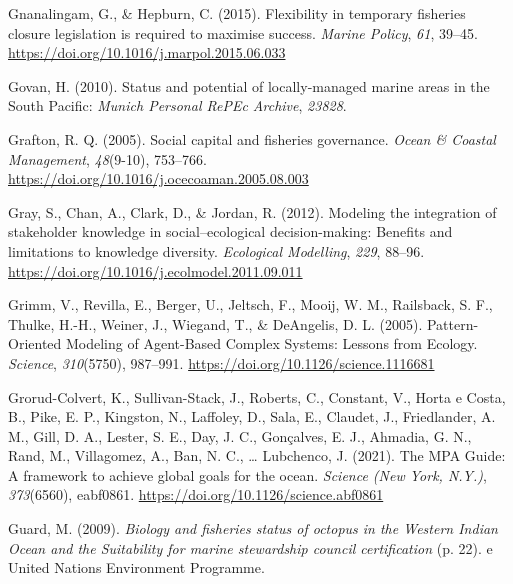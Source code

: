 \documentclass[
  12pt,
]{article}
\newlength{\cslhangindent}
\newlength{\cslentryspacingunit} %
\newenvironment{CSLReferences}[2] %
 {%
  \setlength{\parindent}{0pt}
  \ifodd #1
  \let\oldpar\par
  \def\par{\hangindent=\cslhangindent\oldpar}
  \fi
  \setlength{\parskip}{#2\cslentryspacingunit}
 }%
 {}
\begin{document}
\begin{CSLReferences}{1}{2}
\leavevmode{}%
Gnanalingam, G., \& Hepburn, C. (2015). Flexibility in temporary fisheries closure legislation is required to maximise success. \emph{Marine Policy}, \emph{61}, 39--45. \url{https://doi.org/10.1016/j.marpol.2015.06.033}

\leavevmode{}%
Govan, H. (2010). Status and potential of locally-managed marine areas in the {South} {Pacific}: \emph{Munich Personal RePEc Archive}, \emph{23828}.

\leavevmode{}%
Grafton, R. Q. (2005). Social capital and fisheries governance. \emph{Ocean \& Coastal Management}, \emph{48}(9-10), 753--766. \url{https://doi.org/10.1016/j.ocecoaman.2005.08.003}

\leavevmode{}%
Gray, S., Chan, A., Clark, D., \& Jordan, R. (2012). Modeling the integration of stakeholder knowledge in social--ecological decision-making: {Benefits} and limitations to knowledge diversity. \emph{Ecological Modelling}, \emph{229}, 88--96. \url{https://doi.org/10.1016/j.ecolmodel.2011.09.011}

\leavevmode{}%
Grimm, V., Revilla, E., Berger, U., Jeltsch, F., Mooij, W. M., Railsback, S. F., Thulke, H.-H., Weiner, J., Wiegand, T., \& DeAngelis, D. L. (2005). Pattern-{Oriented} {Modeling} of {Agent}-{Based} {Complex} {Systems}: {Lessons} from {Ecology}. \emph{Science}, \emph{310}(5750), 987--991. \url{https://doi.org/10.1126/science.1116681}

\leavevmode{}%
Grorud-Colvert, K., Sullivan-Stack, J., Roberts, C., Constant, V., Horta e Costa, B., Pike, E. P., Kingston, N., Laffoley, D., Sala, E., Claudet, J., Friedlander, A. M., Gill, D. A., Lester, S. E., Day, J. C., Gonçalves, E. J., Ahmadia, G. N., Rand, M., Villagomez, A., Ban, N. C., \ldots{} Lubchenco, J. (2021). The {MPA} {Guide}: {A} framework to achieve global goals for the ocean. \emph{Science (New York, N.Y.)}, \emph{373}(6560), eabf0861. \url{https://doi.org/10.1126/science.abf0861}

\leavevmode{}%
Guard, M. (2009). \emph{Biology and fisheries status of octopus in the {Western} {Indian} {Ocean} and the {Suitability} for marine stewardship council certification} (p. 22). e United Nations Environment Programme.


\end{CSLReferences}
\end{document}
